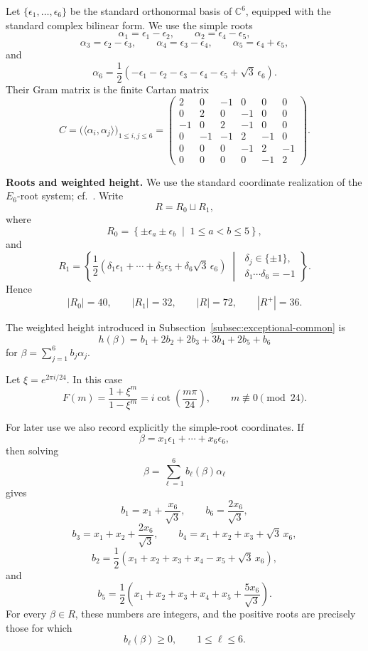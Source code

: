 \documentclass[a4paper,reqno]{amsart}
\theoremstyle{plain} %
\theoremstyle{definition} %
\theoremstyle{remark} %
\newcommand{\1}{\mathds{1}}   %
\begin{document}
Let $\{\epsilon_1,\ldots,\epsilon_6 \}$
be the standard orthonormal basis of \(\mathbb C^6\), equipped with
the standard complex bilinear form.  We use the simple roots
\[
\alpha_1=\epsilon_1-\epsilon_2,
\qquad
\alpha_2=\epsilon_4-\epsilon_5,
\]
\[
\alpha_3=\epsilon_2-\epsilon_3,
\qquad
\alpha_4=\epsilon_3-\epsilon_4,
\qquad
\alpha_5=\epsilon_4+\epsilon_5,
\]
and
\[
\alpha_6
=
\frac12
\left(
-\epsilon_1-\epsilon_2-\epsilon_3-\epsilon_4-\epsilon_5
+\sqrt3\,\epsilon_6
\right).
\]
Their Gram matrix is the finite Cartan matrix
\[
C=
\bigl(\langle\alpha_i,\alpha_j\rangle\bigr)_{1\le i,j\le6}
=
\begin{pmatrix}
2&0&-1&0&0&0\\
0&2&0&-1&0&0\\
-1&0&2&-1&0&0\\
0&-1&-1&2&-1&0\\
0&0&0&-1&2&-1\\
0&0&0&0&-1&2
\end{pmatrix}.
\]

\medskip

\noindent\textbf{Roots and weighted height.}
We use the standard coordinate realization of the \(E_6\)-root system;
cf.~\cite{Humphreys}.  Write
\[
R=R_0\sqcup R_1,
\]
where
\[
R_0
=
\left\{
\pm\epsilon_a\pm\epsilon_b
\;\middle|\;
1\le a<b\le5
\right\},
\]
and
\[
R_1
=
\left\{
\frac12
\left(
\delta_1\epsilon_1+\cdots+\delta_5\epsilon_5
+\delta_6\sqrt3\,\epsilon_6
\right)
\;\middle|\;
\begin{array}{c}
\delta_j\in\{\pm1\},\\
\delta_1\cdots\delta_6=-1
\end{array}
\right\}.
\]
Hence
\[
|R_0|=40,
\qquad
|R_1|=32,
\qquad
|R|=72,
\qquad
|R^+|=36.
\]

The weighted height introduced in
Subsection~\ref{subsec:exceptional-common} is
\[
h(\beta)
=
b_1+2b_2+2b_3+3b_4+2b_5+b_6
\]
for $\beta=\sum_{j=1}^6 b_j\alpha_j$. 


Let $\xi=e^{2\pi i/24}$. 
In
this case
\[
F(m)
=
\frac{1+\xi^m}{1-\xi^m}
=
i\cot\left(\frac{m\pi}{24}\right),
\qquad
m\not\equiv0\pmod{24}.
\]

For later use we also record explicitly the simple-root coordinates.
If
\[
\beta=x_1\epsilon_1+\cdots+x_6\epsilon_6,
\]
then solving
\[
\beta=\sum_{\ell=1}^6 b_\ell(\beta)\alpha_\ell
\]
gives
\[
b_1
=
x_1+\frac{x_6}{\sqrt3},
\qquad
b_6
=
\frac{2x_6}{\sqrt3},
\]
\[
b_3
=
x_1+x_2+\frac{2x_6}{\sqrt3},
\qquad
b_4
=
x_1+x_2+x_3+\sqrt3\,x_6,
\]
\[
b_2
=
\frac12
\left(
x_1+x_2+x_3+x_4-x_5+\sqrt3\,x_6
\right),
\]
and
\[
b_5
=
\frac12
\left(
x_1+x_2+x_3+x_4+x_5+\frac{5x_6}{\sqrt3}
\right).
\]
For every \(\beta\in R\), these numbers are integers, and the positive
roots are precisely those for which
\[
b_\ell(\beta)\ge0,
\qquad
1\le\ell\le6.
\]
\end{document}
